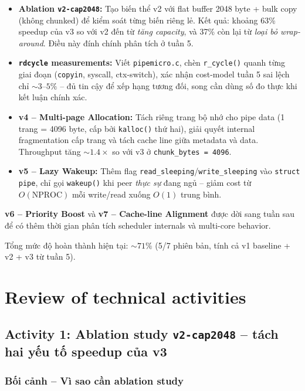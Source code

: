 \documentclass[11pt,a4paper]{article}
\begin{document}
\begin{itemize}
  \item \textbf{Ablation \texttt{v2-cap2048}:} Tạo biến thể v2 với flat buffer 2048 byte + bulk copy (không chunked) để kiểm soát từng biến riêng lẻ. Kết quả: khoảng 63\% speedup của v3 so với v2 đến từ \emph{tăng capacity}, và 37\% còn lại từ \emph{loại bỏ wrap-around}. Điều này đính chính phân tích ở tuần 5.
  \item \textbf{\texttt{rdcycle} measurements:} Viết \texttt{pipemicro.c}, chèn \texttt{r\_cycle()} quanh từng giai đoạn (\texttt{copyin}, syscall, ctx-switch), xác nhận cost-model tuần 5 sai lệch chỉ $\sim 3$--$5\%$ -- đủ tin cậy để xếp hạng tương đối, song cần dùng số đo thực khi kết luận chính xác.
  \item \textbf{v4 -- Multi-page Allocation:} Tách riêng trang bộ nhớ cho pipe data (1 trang = 4096 byte, cấp bởi \texttt{kalloc()} thứ hai), giải quyết internal fragmentation cấp trang và tách cache line giữa metadata và data. Throughput tăng $\sim 1.4\times$ so với v3 ở \texttt{chunk\_bytes = 4096}.
  \item \textbf{v5 -- Lazy Wakeup:} Thêm flag \texttt{read\_sleeping}/\texttt{write\_sleeping} vào \texttt{struct pipe}, chỉ gọi \texttt{wakeup()} khi peer \emph{thực sự} đang ngủ -- giảm cost từ $O(\text{NPROC})$ mỗi write/read xuống $O(1)$ trung bình.
\end{itemize}

\textbf{v6 -- Priority Boost} và \textbf{v7 -- Cache-line Alignment} được dời sang tuần sau để có thêm thời gian phân tích scheduler internals và multi-core behavior.

Tổng mức độ hoàn thành hiện tại: $\sim 71\%$ (5/7 phiên bản, tính cả v1 baseline + v2 + v3 từ tuần 5).

\section{Review of technical activities}

\subsection{Activity 1: Ablation study \texttt{v2-cap2048} -- tách hai yếu tố speedup của v3}

\subsubsection{Bối cảnh -- Vì sao cần ablation study}
\end{document}
